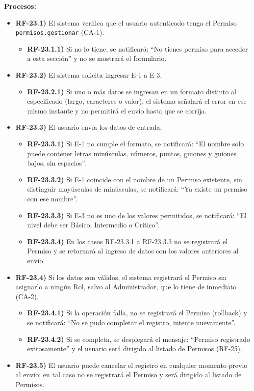 \textbf{Procesos:}
\begin{itemize}[label={}, leftmargin=1.5em]
  \item \textbf{RF-23.1)} El sistema verifica que el usuario autenticado tenga el Permiso \texttt{permisos.gestionar} (CA-1).
  \begin{itemize}[label={}, leftmargin=1.5em]
    \item \textbf{RF-23.1.1)} Si no lo tiene, se notificar\'a: ``No tienes permiso para acceder a esta secci\'on'' y no se mostrar\'a el formulario.
  \end{itemize}
  \item \textbf{RF-23.2)} El sistema solicita ingresar E-1 a E-3.
  \begin{itemize}[label={}, leftmargin=1.5em]
    \item \textbf{RF-23.2.1)} Si uno o m\'as datos se ingresan en un formato distinto al especificado (largo, caracteres o valor), el sistema se\~nalar\'a el error en ese mismo instante y no permitir\'a el env\'io hasta que se corrija.
  \end{itemize}
  \item \textbf{RF-23.3)} El usuario env\'ia los datos de entrada.
  \begin{itemize}[label={}, leftmargin=1.5em]
    \item \textbf{RF-23.3.1)} Si E-1 no cumple el formato, se notificar\'a: ``El nombre solo puede contener letras min\'usculas, n\'umeros, puntos, guiones y guiones bajos, sin espacios''.
    \item \textbf{RF-23.3.2)} Si E-1 coincide con el nombre de un Permiso existente, sin distinguir may\'usculas de min\'usculas, se notificar\'a: ``Ya existe un permiso con ese nombre''.
    \item \textbf{RF-23.3.3)} Si E-3 no es uno de los valores permitidos, se notificar\'a: ``El nivel debe ser B\'asico, Intermedio o Cr\'itico''.
    \item \textbf{RF-23.3.4)} En los casos RF-23.3.1 a RF-23.3.3 no se registrar\'a el Permiso y se retornar\'a al ingreso de datos con los valores anteriores al env\'io.
  \end{itemize}
  \item \textbf{RF-23.4)} Si los datos son v\'alidos, el sistema registrar\'a el Permiso sin asignarlo a ning\'un Rol, salvo al Administrador, que lo tiene de inmediato (CA-2).
  \begin{itemize}[label={}, leftmargin=1.5em]
    \item \textbf{RF-23.4.1)} Si la operaci\'on falla, no se registrar\'a el Permiso (rollback) y se notificar\'a: ``No se pudo completar el registro, intente nuevamente''.
    \item \textbf{RF-23.4.2)} Si se completa, se desplegar\'a el mensaje: ``Permiso registrado exitosamente'' y el usuario ser\'a dirigido al listado de Permisos (RF-25).
  \end{itemize}
  \item \textbf{RF-23.5)} El usuario puede cancelar el registro en cualquier momento previo al env\'io; en tal caso no se registrar\'a el Permiso y ser\'a dirigido al listado de Permisos.
\end{itemize}

